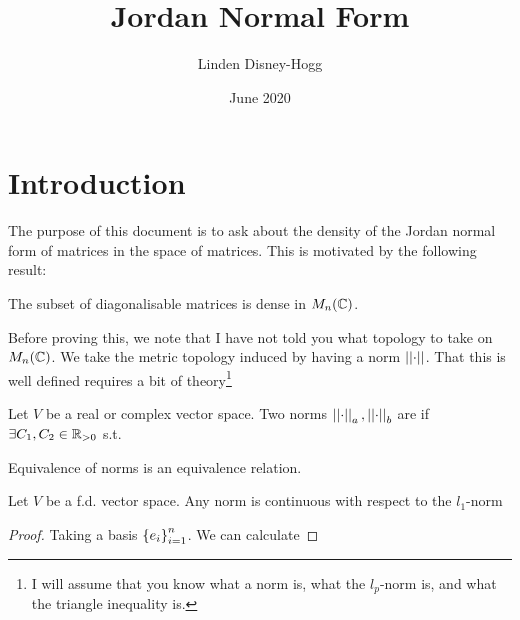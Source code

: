 \documentclass{article}
\title{Jordan Normal Form}
\author{Linden Disney-Hogg}
\date{June 2020}
\begin{document}
\maketitle

\section{Introduction}
The purpose of this document is to ask about the density of the Jordan normal form of matrices in the space of matrices. This is motivated by the following result:
\begin{theorem}
	The subset of diagonalisable matrices is dense in $M_n(\mathbb{C})$. 
\end{theorem}
Before proving this, we note that I have not told you what topology to take on $M_n(\mathbb{C})$. We take the metric topology induced by having a norm $\left\lvert\left\lvert \cdot \right\rvert\right\rvert$. That this is well defined requires a bit of theory\footnote{I will assume that you know what a norm is, what the $l_p$-norm is, and what the triangle inequality is. }

\begin{definition}
	Let $V$ be a real or complex vector space. Two norms $\left\lvert\left\lvert \cdot \right\rvert\right\rvert_a, \left\lvert\left\lvert \cdot \right\rvert\right\rvert_b$ are  if $\exists C_1, C_2 \in \mathbb{R}_{>0}$ s.t. 
\end{definition}

\begin{lemma}
	Equivalence of norms is an equivalence relation. 
\end{lemma}

\begin{lemma}
	Let $V$ be a f.d. vector space. Any norm is continuous with respect to the $l_1$-norm
\end{lemma}
\begin{proof}
Taking a basis $\left\{ e_i \right\}_{i=1}^n$. We can calculate
\end{proof}
\end{document}
